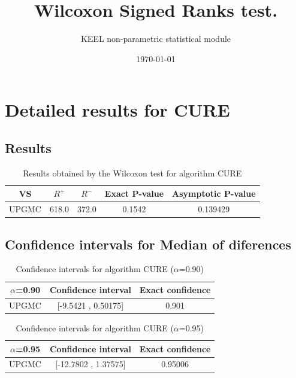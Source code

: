 \documentclass[a4paper,10pt]{article}
\title{Wilcoxon Signed Ranks test.}
\date{\today}
\author{KEEL non-parametric statistical module}
\begin{document}
\pagestyle{empty}
\maketitle
\thispagestyle{empty}



\section{Detailed results for CURE}


\subsection{Results}

\begin{table}[!htp]
\centering\small
\begin{tabular}{
|c|c|c|c|c|}
\hline
 VS & $R^{+}$ & $R^{-}$ & Exact P-value & Asymptotic P-value \\ \hline 
UPGMC & 618.0 & 372.0 & 0.1542 & 0.139429\\ \hline 

\end{tabular}
\caption{Results obtained by the Wilcoxon test for algorithm CURE}
\end{table}

\subsection{Confidence intervals for Median of diferences}

\begin{table}[!htp]
\centering\small
\begin{tabular}{
|c|c|c|}
\hline
 $\alpha$=0.90 & Confidence interval & Exact confidence \\ \hline 
UPGMC & [-9.5421 , 0.50175] & 0.901\\ \hline 

\end{tabular}
\caption{Confidence intervals for algorithm CURE ($\alpha$=0.90)}
\end{table}
\begin{table}[!htp]
\centering\small
\begin{tabular}{
|c|c|c|}
\hline
 $\alpha$=0.95 & Confidence interval & Exact confidence \\ \hline 
UPGMC & [-12.7802 , 1.37575] & 0.95006\\ \hline 

\end{tabular}
\caption{Confidence intervals for algorithm CURE ($\alpha$=0.95)}
\end{table}
\end{document}
